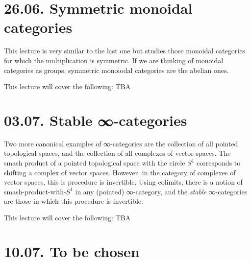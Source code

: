 \documentclass[a4paper]{amsart}
\numberwithin{figure}{section}
\theoremstyle{theorem}
\theoremstyle{definition}
\begin{document}



\section{26.06. Symmetric monoidal categories}

This lecture is very similar to the last one but studies those monoidal categories for which the multiplication is symmetric. If we are thinking of monoidal categories as groups, symmetric monoiodal categories are the abelian ones.

This lecture will cover the following: TBA

\section{03.07. Stable ∞-categories}

Two more canonical examples of ∞-categories are the collection of all pointed topological spaces, and the collection of all complexes of vector spaces. The smash product of a pointed topological space with the circle $S^1$ corresponds to shifting a complex of vector spaces. %
However, in the category of complexes of vector spaces, this is procedure is invertible. Using colimits, there is a notion of smash-product-with-$S^1$ in any (pointed) ∞-category, and the \emph{stable} ∞-categories are those in which this procedure is invertible.

This lecture will cover the following: TBA


%


\section{10.07. To be chosen}
\end{document}
